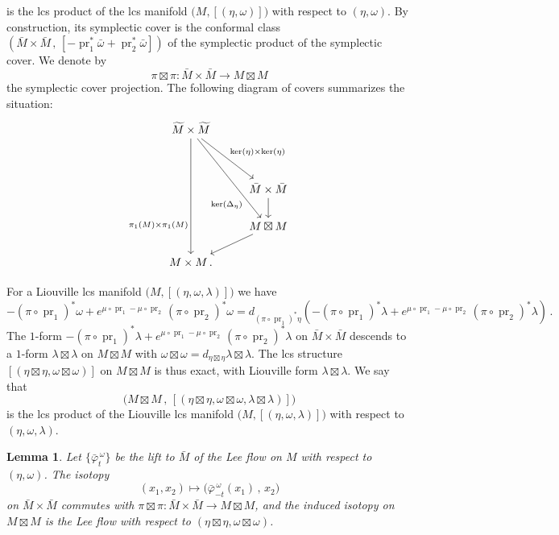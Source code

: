 \documentclass{amsart}
\DeclareMathOperator{\pr}{pr}
\newtheorem{lemma}[thm]{Lemma}
\theoremstyle{remark}
\begin{document}
is the lcs product of the lcs manifold
$\big( M, [(\eta, \omega)] \big)$
with respect to $(\eta, \omega)$.
By construction,
its symplectic cover is the conformal class
$(\bar{M} \times \bar{M} \,,\,
[- \pr_1^{\ast} \bar{\omega} + \pr_2^{\ast}\bar{\omega}] )$
of the symplectic product of the symplectic cover.
We denote by
\[
\pi \boxtimes \pi: \bar{M} \times \bar{M}
\rightarrow M \boxtimes M
\]
the symplectic cover projection.
The following diagram of covers
summarizes the situation:
\[
\begin{tikzcd}
\widetilde{M} \times \widetilde{M}
\arrow[rdd, "\ker(\eta) \times \ker(\eta)"]
\arrow[rddd, "\ker(\Delta_{\eta})"' near end]
\arrow[dddd, "\pi_1 (M) \times \pi_1 (M)" ' near end]
& \\
& \\
& \bar{M} \times \bar{M} \arrow{d} \\
& M \boxtimes M \arrow{ld} \\
M \times M \,.
\end{tikzcd}
\]

For a Liouville lcs manifold
$\big( M, [(\eta, \omega, \lambda)] \big)$
we have
\[
- (\pi \circ \pr_1)^{\ast} \omega
+ e^{\mu \circ \pr_1 - \mu \circ \pr_2} \, (\pi \circ \pr_2)^{\ast} \omega
= d_{(\pi \circ \pr_1)^{\ast} \eta}
( - (\pi \circ \pr_1)^{\ast} \lambda
+ e^{\mu \circ \pr_1 - \mu \circ \pr_2} \, (\pi \circ \pr_2)^{\ast} \lambda ) \,.
\]
The $1$-form $- (\pi \circ \pr_1)^{\ast}\lambda
+ e^{\mu \circ \pr_1 - \mu \circ \pr_2} \, (\pi \circ \pr_2)^{\ast} \lambda$
on $\bar{M} \times \bar{M}$
descends to a $1$-form $\lambda \boxtimes \lambda$
on $M \boxtimes M$
with $\omega \boxtimes \omega
= d_{\eta \boxtimes \eta} \lambda \boxtimes \lambda$.
The lcs structure $[(\eta \boxtimes \eta, \omega \boxtimes \omega)]$
on $M \boxtimes M$ is thus exact,
with Liouville form $\lambda \boxtimes \lambda$.
We say that
$$
\big(M \boxtimes M \,,\,
[(\eta \boxtimes \eta, \omega \boxtimes \omega, \lambda \boxtimes \lambda)] \big)
$$
is the lcs product of the Liouville lcs manifold
$\big( M, [(\eta, \omega, \lambda)] \big)$
with respect to $(\eta, \omega, \lambda)$.

\begin{lemma}\label{lemma: Lee flow lcs product}
Let $\{\bar{\varphi}_t^{\,\omega}\}$
be the lift to $\bar{M}$ of the Lee flow on $M$
with respect to $(\eta, \omega)$.
The isotopy
\[
(x_1, x_2) \mapsto \big( \bar{\varphi}_{-t}^{\,\omega} (x_1) \,,\, x_2 \big) 
\]
on $\bar{M} \times \bar{M}$
commutes with $\pi \boxtimes \pi: \bar{M} \times \bar{M} \rightarrow M \boxtimes M$,
and the induced isotopy on $M \boxtimes M$
is the Lee flow with respect to
$(\eta \boxtimes \eta, \omega \boxtimes \omega)$.
\end{lemma}
\end{document}
